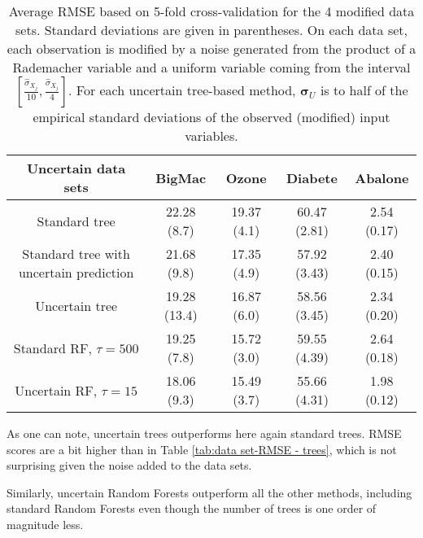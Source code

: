 \begin{table*}[ht!]
  \centering
      \begin{tabular}{ccccc}
        Uncertain data sets  & {BigMac} &{Ozone} &{Diabete} &{Abalone} \\
        \hline
        \hline
        Standard tree & 22.28 (8.7) & 19.37 (4.1) & 60.47 (2.81) & 2.54 (0.17)\\
        Standard tree with uncertain prediction & 21.68 (9.8) & 17.35 (4.9) & 57.92 (3.43) & 2.40 (0.15)\\
      Uncertain tree & 19.28 (13.4) & 16.87 (6.0) & 58.56 (3.45) & 2.34 (0.20)\\
      \hline
         Standard RF, $\tau = 500$ & 19.25 (7.8) & 15.72 (3.0) & 59.55 (4.39) & 2.64 (0.18) \\
        Uncertain RF, $\tau = 15$ &18.06 (9.3)& 15.49 (3.7) & 55.66 (4.31) & 1.98 (0.12) \\
        \hline
      \end{tabular}
\caption{Average RMSE based on 5-fold cross-validation for the 4 modified data sets. Standard deviations are given in parentheses. On each data set, each observation is modified by a noise generated from the product of a Rademacher variable and a uniform variable coming from the interval $[\frac{\hat{\sigma}_{X_j}}{10}, \frac{\hat{\sigma}_{X_j}}{4}]$. For each uncertain tree-based method, $\boldsymbol{\sigma}_U$ is to half of the empirical standard deviations of the observed (modified) input variables.}
\label{tab:data set-RMSE - RF}

\end{table*}

As one can note, uncertain trees outperforms here again standard trees. RMSE scores are a bit higher than in Table \ref{tab:data set-RMSE - trees}, which is not surprising given the noise added to the data sets.

Similarly, uncertain Random Forests outperform all the other methods, including standard Random Forests even though the number of trees is one order of magnitude less. 

